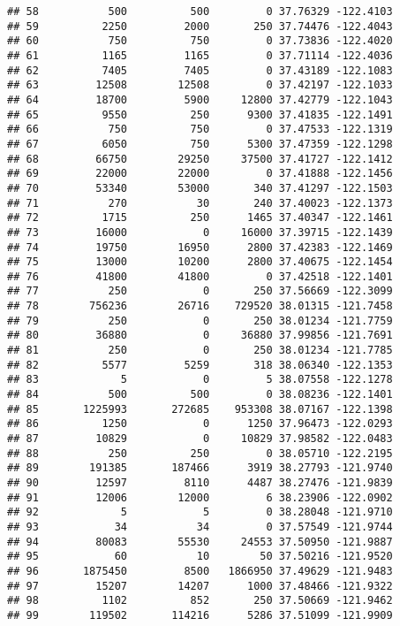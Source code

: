 \documentclass[
]{book}
\begin{document}
\begin{verbatim}
## 58           500          500         0 37.76329 -122.4103
## 59          2250         2000       250 37.74476 -122.4043
## 60           750          750         0 37.73836 -122.4020
## 61          1165         1165         0 37.71114 -122.4036
## 62          7405         7405         0 37.43189 -122.1083
## 63         12508        12508         0 37.42197 -122.1033
## 64         18700         5900     12800 37.42779 -122.1043
## 65          9550          250      9300 37.41835 -122.1491
## 66           750          750         0 37.47533 -122.1319
## 67          6050          750      5300 37.47359 -122.1298
## 68         66750        29250     37500 37.41727 -122.1412
## 69         22000        22000         0 37.41888 -122.1456
## 70         53340        53000       340 37.41297 -122.1503
## 71           270           30       240 37.40023 -122.1373
## 72          1715          250      1465 37.40347 -122.1461
## 73         16000            0     16000 37.39715 -122.1439
## 74         19750        16950      2800 37.42383 -122.1469
## 75         13000        10200      2800 37.40675 -122.1454
## 76         41800        41800         0 37.42518 -122.1401
## 77           250            0       250 37.56669 -122.3099
## 78        756236        26716    729520 38.01315 -121.7458
## 79           250            0       250 38.01234 -121.7759
## 80         36880            0     36880 37.99856 -121.7691
## 81           250            0       250 38.01234 -121.7785
## 82          5577         5259       318 38.06340 -122.1353
## 83             5            0         5 38.07558 -122.1278
## 84           500          500         0 38.08236 -122.1401
## 85       1225993       272685    953308 38.07167 -122.1398
## 86          1250            0      1250 37.96473 -122.0293
## 87         10829            0     10829 37.98582 -122.0483
## 88           250          250         0 38.05710 -122.2195
## 89        191385       187466      3919 38.27793 -121.9740
## 90         12597         8110      4487 38.27476 -121.9839
## 91         12006        12000         6 38.23906 -122.0902
## 92             5            5         0 38.28048 -121.9710
## 93            34           34         0 37.57549 -121.9744
## 94         80083        55530     24553 37.50950 -121.9887
## 95            60           10        50 37.50216 -121.9520
## 96       1875450         8500   1866950 37.49629 -121.9483
## 97         15207        14207      1000 37.48466 -121.9322
## 98          1102          852       250 37.50669 -121.9462
## 99        119502       114216      5286 37.51099 -121.9909

\end{verbatim}
\end{document}
